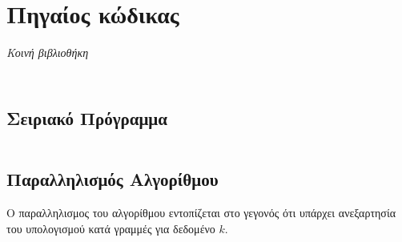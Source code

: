 \documentclass[a4paper,10pt]{article} \usepackage{anysize}
\begin{document}

\renewcommand{\theenumi}{\roman{enumi}}


\def\thesubsection {Ζητούμενο \arabic{subsection}}
\section*{Πηγαίος κώδικας}

\emph{Κοινή βιβλιοθήκη}

\inputminted[linenos,fontsize=\footnotesize,frame=leftline]{c}{files/src-lib-common.h}

\inputminted[linenos,fontsize=\footnotesize,frame=leftline]{c}{files/src-lib-common.c}

\setcounter{section}{1}
\subsection{Σειριακό Πρόγραμμα}

\inputminted[linenos,fontsize=\footnotesize,frame=leftline]{c}{files/src-serial-main.c}

\subsection{Παραλληλισμός Αλγορίθμου}

Ο παραλληλισμος του αλγορίθμου εντοπίζεται στο γεγονός ότι υπάρχει ανεξαρτησία
του υπολογισμού κατά γραμμές για δεδομένο $k$. 
\end{document}
